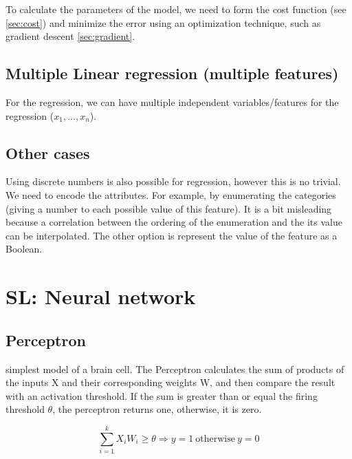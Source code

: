 \documentclass[12pt]{report}
\begin{document}
To calculate the parameters of the model, we need to form the cost function (see \ref{sec:cost}) and minimize the error using an optimization technique, such as gradient descent \ref{sec:gradient}.

\subsection{Multiple Linear regression (multiple features)}

For the regression, we can have multiple independent variables/features for the regression ($x_1, ..., x_n$).



\subsection{Other cases}
Using discrete numbers is also possible for regression, however this is no trivial. We need to encode the attributes. For example, by enumerating the categories (giving a number to each possible value of this feature). It is a bit misleading because a correlation between the ordering of the
enumeration and the its value can be interpolated. The other option is represent the value of the feature as a Boolean.

\section{SL: Neural network}


\subsection{Perceptron}

simplest model of a brain cell. The Perceptron calculates the sum of products of the inputs X and their corresponding weights W, and then compare the result with an activation threshold. If the sum is greater than or equal the firing threshold $\theta$, the perceptron returns one, otherwise, it is zero.

\begin{equation}
\sum_{i=1}^k X_i W_i \ge \theta  \Rightarrow y = 1 \: \text{otherwise} \: y = 0
\end{equation}
\end{document}
